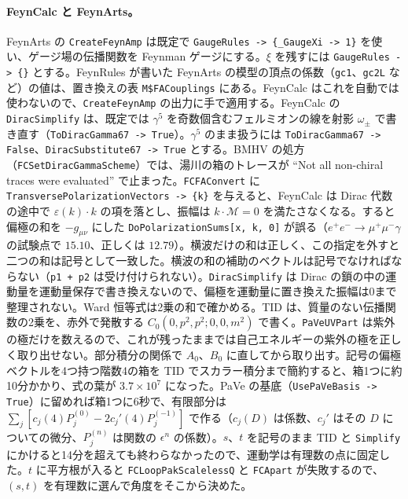 \documentclass[a4paper,10pt]{ltjsarticle}
\begin{document}
\paragraph{FeynCalc と FeynArts。}FeynArts の \texttt{CreateFeynAmp} は既定で \texttt{GaugeRules -> \{\_GaugeXi -> 1\}} を使い、ゲージ場の伝播関数を Feynman ゲージにする。$\xi$ を残すには \texttt{GaugeRules -> \{\}} とする。FeynRules が書いた FeynArts の模型の頂点の係数（\texttt{gc1}、\texttt{gc2L} など）の値は、置き換えの表 \texttt{M\$FACouplings} にある。FeynCalc はこれを自動では使わないので、\texttt{CreateFeynAmp} の出力に手で適用する。FeynCalc の \texttt{DiracSimplify} は、既定では $\gamma^5$ を奇数個含むフェルミオンの線を射影 $\omega_\pm$ で書き直す（\texttt{ToDiracGamma67 -> True}）。$\gamma^5$ のまま扱うには \texttt{ToDiracGamma67 -> False}、\texttt{DiracSubstitute67 -> True} とする。BMHV の処方（\texttt{FCSetDiracGammaScheme}）では、湯川の箱のトレースが ``Not all non-chiral traces were evaluated'' で止まった。\texttt{FCFAConvert} に \texttt{TransversePolarizationVectors -> \{k\}} を与えると、FeynCalc は Dirac 代数の途中で $\varepsilon(k)\cdot k$ の項を落とし、振幅は $k\cdot\mathcal M=0$ を満たさなくなる。すると偏極の和を $-g_{\mu\nu}$ にした \texttt{DoPolarizationSums[x, k, 0]} が誤る（$e^+e^-\to\mu^+\mu^-\gamma$ の試験点で $15.10$、正しくは $12.79$）。横波だけの和は正しく、この指定を外すと二つの和は記号として一致した。横波の和の補助のベクトルは記号でなければならない（\texttt{p1 + p2} は受け付けられない）。\texttt{DiracSimplify} は Dirac の鎖の中の運動量を運動量保存で書き換えないので、偏極を運動量に置き換えた振幅は0まで整理されない。Ward 恒等式は2乗の和で確かめる。TID は、質量のない伝播関数の2乗を、赤外で発散する $C_0(0,p^2,p^2;0,0,m^2)$ で書く。\texttt{PaVeUVPart} は紫外の極だけを数えるので、これが残ったままでは自己エネルギーの紫外の極を正しく取り出せない。部分積分の関係で $A_0$、$B_0$ に直してから取り出す。記号の偏極ベクトルを4つ持つ階数4の箱を TID でスカラー積分まで簡約すると、箱1つに約10分かかり、式の葉が $3.7\times10^7$ になった。PaVe の基底（\texttt{UsePaVeBasis -> True}）に留めれば箱1つに6秒で、有限部分は $\sum_j[c_j(4)P_j^{(0)}-2c_j'(4)P_j^{(-1)}]$ で作る（$c_j(D)$ は係数、$c_j'$ はその $D$ についての微分、$P_j^{(n)}$ は関数の $\epsilon^n$ の係数）。$s$、$t$ を記号のまま TID と \texttt{Simplify} にかけると14分を超えても終わらなかったので、運動学は有理数の点に固定した。$t$ に平方根が入ると \texttt{FCLoopPakScalelessQ} と \texttt{FCApart} が失敗するので、$(s,t)$ を有理数に選んで角度をそこから決めた。
\end{document}

